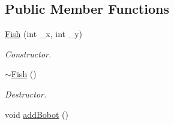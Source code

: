 \subsection*{Public Member Functions}
\begin{DoxyCompactItemize}
\item 
\hyperlink{classFish_ab1571c3fdf3033dbf21851b52f71288d}{Fish} (int \-\_\-x, int \-\_\-y)
\begin{DoxyCompactList}\small\item\em Constructor. \end{DoxyCompactList}\item 
\hypertarget{classFish_a23885c7956e22f0181360098cfe16659}{\hyperlink{classFish_a23885c7956e22f0181360098cfe16659}{$\sim$\-Fish} ()}\label{classFish_a23885c7956e22f0181360098cfe16659}

\begin{DoxyCompactList}\small\item\em Destructor. \end{DoxyCompactList}\item 
\hypertarget{classFish_acfab5585f69d7c1f786163530168ff11}{void \hyperlink{classFish_acfab5585f69d7c1f786163530168ff11}{add\-Bobot} ()}\label{classFish_acfab5585f69d7c1f786163530168ff11}


\end{DoxyCompactItemize}
